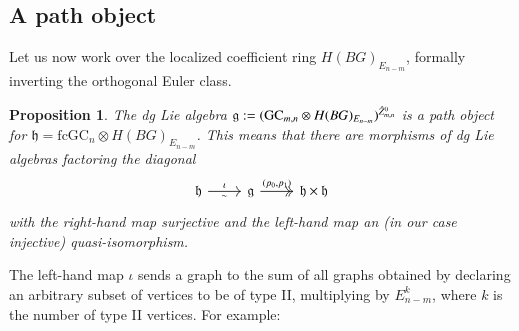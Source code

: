 \documentclass[a4paper]{amsart}
\theoremstyle{plain}
\newtheorem{prop}[thm]{Proposition}
\theoremstyle{definition}
\newcommand{\alg}[1]{\mathfrak{{#1}}}
\newcommand{\fGCc}{{\mathrm{fcGC}}}
\newcommand{\GC}{\mathrm{GC}}
\begin{document}
\subsection{A path object}
Let us now work over the localized coefficient ring $H(BG)_{E_{n-m}}$, formally inverting the orthogonal Euler class.
\begin{prop}\label{prop:pathobject}
The dg Lie algebra $\alg g:=(\GC_{m,n} \otimes H(BG)_{E_{n-m}})^{\hZ_{m,n}^0}$ is a path object for $\alg h=\fGCc_n \otimes H(BG)_{E_{n-m}}$.
This means that there are morphisms of dg Lie algebras factoring the diagonal
\[
\begin{tikzcd}
\alg h \ar{r}{\iota}[swap]{\sim} & \alg g 
\ar[two heads]{r}{(p_0,p_1)}& \alg h \times \alg h
\end{tikzcd}
\]
with the right-hand map surjective and the left-hand map an (in our case injective) quasi-isomorphism.
\end{prop}
The left-hand map $\iota$ sends a graph to the sum of all graphs obtained by declaring an arbitrary subset of vertices to be of type II, multiplying by $E_{n-m}^k$, where $k$ is the number of type II vertices. For example:
\end{document}
